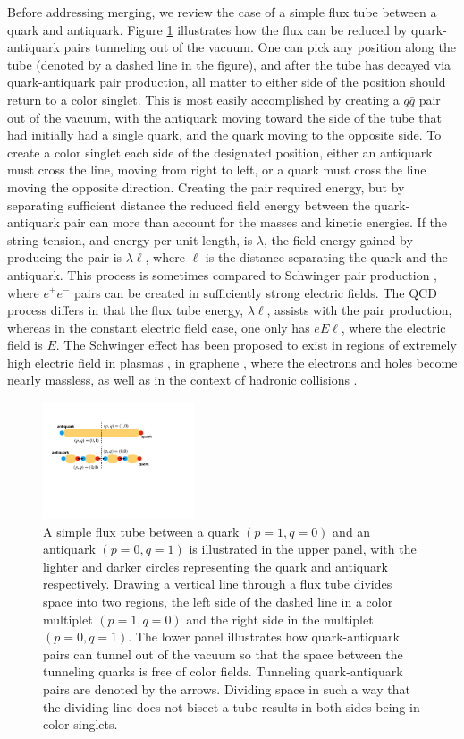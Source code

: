 \documentclass[aps, prc, 12pt, nofootinbib, showpacs, superscriptaddress, tightenlines, groupedaddress]{revtex4-2}
\begin{document}
Before addressing merging, we review the case of a simple flux tube between a quark and antiquark. Figure \ref{fig:simpletube} illustrates how the flux can be reduced by quark-antiquark pairs tunneling out of the vacuum. One can pick any position along the tube (denoted by a dashed line in the figure), and after the tube has decayed via quark-antiquark pair production, all matter to either side of the position should return to a color singlet. This is most easily accomplished by creating a $q\bar{q}$ pair out of the vacuum, with the antiquark moving toward the side of the tube that had initially had a single quark, and the quark moving to the opposite side. To create a color singlet each side of the designated position, either an antiquark must cross the line, moving from right to left, or a quark must cross the  line moving the opposite direction. Creating the pair required energy, but by separating sufficient distance the reduced field energy between the quark-antiquark pair can more than account for the masses and kinetic energies. If the string tension, and energy per unit length, is $\lambda$, the field energy gained by producing the pair is $\lambda \ell$, where $\ell$ is the distance separating the quark and the antiquark. This process is sometimes compared to Schwinger pair production \cite{Schwinger}, where $e^+e^-$ pairs can be created in sufficiently strong electric fields. The QCD process differs in that the flux tube energy, $\lambda\ell$, assists with the pair production, whereas in the constant electric field case, one only has $eE\ell$, where the electric field is $E$. The Schwinger effect has been proposed to exist in regions of extremely high electric field in plasmas \cite{SchwingerPlasma}, in graphene \cite{SchwingerGraphene}, where the electrons and holes become nearly massless, as well as in the context of hadronic collisions \cite{Wong:1994ei,Suganuma:1991ha}.
\begin{figure}
\centerline{\includegraphics[width=0.4\textwidth]{figs/simpletube.pdf}}
\caption{\label{fig:simpletube}
A simple flux tube between a quark $(p=1,q=0)$ and an antiquark $(p=0,q=1)$ is illustrated in the upper panel, with the lighter and darker circles representing the quark and antiquark respectively. Drawing a vertical line through a flux tube divides space into two regions, the left side of the dashed line in a color multiplet $(p=1,q=0)$ and the right side in the multiplet $(p=0,q=1)$. The lower panel illustrates how quark-antiquark pairs can tunnel out of the vacuum so that the space between the tunneling quarks is free of color fields. Tunneling quark-antiquark pairs are denoted by the arrows.  Dividing space in such a way that the dividing line does not bisect a tube results in both sides being in color singlets.
}
\end{figure}
\end{document}
